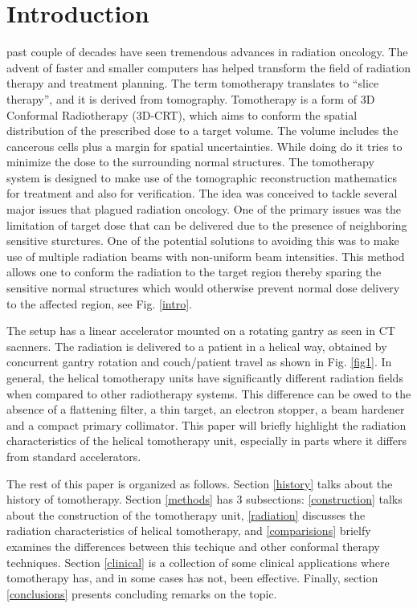 \documentclass[10pt,journal,compsoc]{IEEEtran} %
\begin{document}
  \section{Introduction}
	 past couple of decades have seen tremendous advances in 
	radiation oncology. The advent of faster and smaller computers has helped 
	transform the field of radiation therapy and treatment planning. The term 
	tomotherapy translates to ``slice therapy'', and it is derived from 
	tomography. Tomotherapy is a form of 3D Conformal Radiotherapy (3D-CRT), 
  which aims to conform the spatial distribution of the prescribed dose to a 
  target volume. The volume includes the cancerous cells plus a margin for 
  spatial uncertainties. While doing do it tries to minimize the dose to the
  surrounding normal structures. The tomotherapy system is designed to make use 
  of the tomographic 	reconstruction mathematics for treatment and also for 
  verification. The idea 	was conceived to tackle several major issues that 
  plagued radiation oncology. One of the primary issues was the limitation of 
  target dose that can be 	delivered due to the presence of neighboring 
  sensitive sturctures. One of the 	potential solutions to avoiding this was 
  to make use of multiple radiation 	beams with non-uniform beam intensities. 
  This method allows one to conform 	the radiation to the target region 
  thereby   sparing the sensitive normal 	structures which would otherwise 
  prevent   normal dose delivery to the affected 	region, see Fig. \ref{intro}.
  
  The setup has a 
  linear accelerator mounted on a rotating gantry as seen in CT 
  sacnners. The radiation is delivered to a patient in a helical way, obtained 
  by concurrent gantry rotation and couch/patient travel as shown in Fig. 
  \ref{fig1}. In general, the helical tomotherapy units have significantly 
  different radiation fields when compared to other radiotherapy systems. This 
  difference can be owed to the absence of a flattening filter, a 
  thin target, an electron stopper, a beam hardener and a compact primary 
  collimator. This paper will briefly highlight the 
  radiation characteristics of the helical tomotherapy unit, especially in 
  parts where it differs from standard accelerators.
  
  The rest of this paper is 
  organized as follows. Section \ref{history} talks 
  about the history of tomotherapy. Section \ref{methods} has 3 subsections: 
  \ref{construction} talks about the construction of the tomotherapy unit, 
  \ref{radiation} discusses the radiation characteristics of helical 
  tomotherapy, and \ref{comparisions} brielfy examines the differences between 
  this techique and other conformal therapy techniques. Section \ref{clinical} 
  is a collection of some clinical applications where tomotherapy 
  has, and in some cases has not,  been effective. Finally, section 
  \ref{conclusions} presents concluding 
  remarks on the topic. 
  
\end{document}
